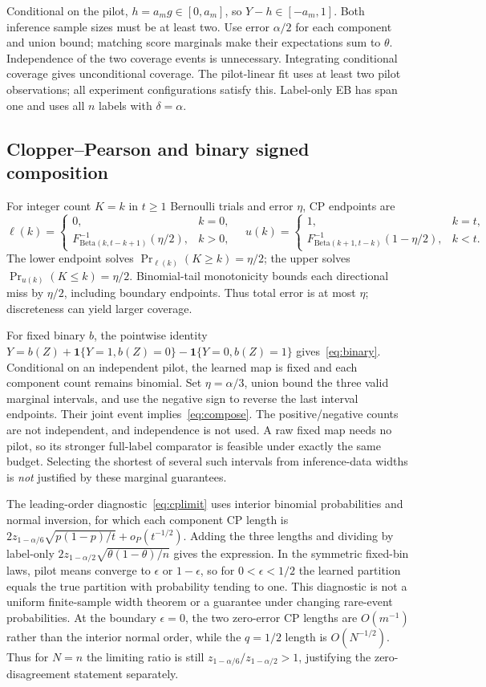 \documentclass{article}
\newcommand{\ind}{\mathbf{1}}
\begin{document}
Conditional on the pilot, $h=a_mg\in[0,a_m]$, so $Y-h\in[-a_m,1]$. Both inference sample sizes must be at least two. Use error $\alpha/2$ for each component and union bound; matching score marginals make their expectations sum to $\theta$. Independence of the two coverage events is unnecessary. Integrating conditional coverage gives unconditional coverage. The pilot-linear fit uses at least two pilot observations; all experiment configurations satisfy this. Label-only EB has span one and uses all $n$ labels with $\delta=\alpha$.

\subsection{Clopper--Pearson and binary signed composition}
For integer count $K=k$ in $t\ge1$ Bernoulli trials and error $\eta$, CP endpoints are
\[
 \ell(k)=\begin{cases}0,&k=0,\\F^{-1}_{\mathrm{Beta}(k,t-k+1)}(\eta/2),&k>0,\end{cases}\quad
 u(k)=\begin{cases}1,&k=t,\\F^{-1}_{\mathrm{Beta}(k+1,t-k)}(1-\eta/2),&k<t.\end{cases}
\]
The lower endpoint solves $\Pr_{\ell(k)}(K\ge k)=\eta/2$; the upper solves $\Pr_{u(k)}(K\le k)=\eta/2$. Binomial-tail monotonicity bounds each directional miss by $\eta/2$, including boundary endpoints. Thus total error is at most $\eta$; discreteness can yield larger coverage.

For fixed binary $b$, the pointwise identity
$Y=b(Z)+\ind\{Y=1,b(Z)=0\}-\ind\{Y=0,b(Z)=1\}$ gives~\eqref{eq:binary}. Conditional on an independent pilot, the learned map is fixed and each component count remains binomial. Set $\eta=\alpha/3$, union bound the three valid marginal intervals, and use the negative sign to reverse the last interval endpoints. Their joint event implies~\eqref{eq:compose}. The positive/negative counts are not independent, and independence is not used. A raw fixed map needs no pilot, so its stronger full-label comparator is feasible under exactly the same budget. Selecting the shortest of several such intervals from inference-data widths is \emph{not} justified by these marginal guarantees.

The leading-order diagnostic~\eqref{eq:cplimit} uses interior binomial probabilities and normal inversion, for which each component CP length is $2z_{1-\alpha/6}\sqrt{p(1-p)/t}+o_P(t^{-1/2})$. Adding the three lengths and dividing by label-only $2z_{1-\alpha/2}\sqrt{\theta(1-\theta)/n}$ gives the expression. In the symmetric fixed-bin laws, pilot means converge to $\epsilon$ or $1-\epsilon$, so for $0<\epsilon<1/2$ the learned partition equals the true partition with probability tending to one. This diagnostic is not a uniform finite-sample width theorem or a guarantee under changing rare-event probabilities. At the boundary $\epsilon=0$, the two zero-error CP lengths are $O(m^{-1})$ rather than the interior normal order, while the $q=1/2$ length is $O(N^{-1/2})$. Thus for $N=n$ the limiting ratio is still $z_{1-\alpha/6}/z_{1-\alpha/2}>1$, justifying the zero-disagreement statement separately.
\end{document}
